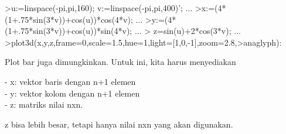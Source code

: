 \documentclass[a4paper,10pt]{article}
\begin{document}
\begin{eulernotebook}
\begin{eulercomment}
\begin{eulercomment}
\begin{eulerprompt}
\end{eulerprompt}
\begin{eulerprompt}
>u:=linspace(-pi,pi,160); v:=linspace(-pi,pi,400)';  ...
>x:=(4*(1+.75*sin(3*v))+cos(u))*cos(4*v); ...
>y:=(4*(1+.75*sin(3*v))+cos(u))*sin(4*v); ...
> z=sin(u)+2*cos(3*v); ...
>plot3d(x,y,z,frame=0,scale=1.5,hue=1,light=[1,0,-1],zoom=2.8,>anaglyph):
\end{eulerprompt}
\begin{eulercomment}
Plot bar juga dimungkinkan. Untuk ini, kita harus menyediakan

- x: vektor baris dengan n+1 elemen\\
- y: vektor kolom dengan n+1 elemen\\
- z: matriks nilai nxn.

z bisa lebih besar, tetapi hanya nilai nxn yang akan digunakan.


\end{eulercomment}
\end{eulercomment}
\end{eulercomment}
\end{eulernotebook}
\end{document}
